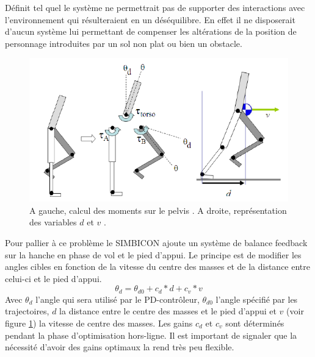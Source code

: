 \documentclass{llncs}
\begin{document}
Définit tel quel le système ne permettrait pas de supporter des interactions avec l'environnement qui résulteraient en un déséquilibre. En effet il ne disposerait d'aucun système lui permettant de compenser les altérations de la position de personnage introduites par un sol non plat ou bien un obstacle.

\begin{figure}[h]
\centering
\includegraphics[scale=0.5]{stance_torque_and_v_and_d.png}
\caption{A gauche, calcul des moments sur le pelvis \cite{yin2007simbicon}. A droite, représentation des variables \(d\) et \(v\) \cite{yin2007simbicon}.}
\label{fig:torques_pelvis}
\label{fig:d_and_v}
\end{figure}

Pour pallier à ce problème le SIMBICON ajoute un système de balance feedback sur la hanche en phase de vol et le pied d'appui. Le principe est de modifier les angles cibles en fonction de la vitesse du centre des masses et de la distance entre celui-ci et le pied d'appui. 
\[
\theta_d=\theta_{d0} + c_d*d + c_v*v 
\]
Avec \(\theta_d\) l'angle qui sera utilisé par le PD-contrôleur, \(\theta_{d0}\) l'angle spécifié par les trajectoires, \(d\) la distance entre le centre des masses et le pied d'appui et \(v\) (voir figure \ref{fig:d_and_v}) la vitesse de centre des masses.
Les gains \(c_d\) et \(c_v\) sont déterminés pendant la phase d'optimisation hors-ligne. Il est important de signaler que la nécessité d'avoir des gains optimaux la rend très peu flexible.
\end{document}
